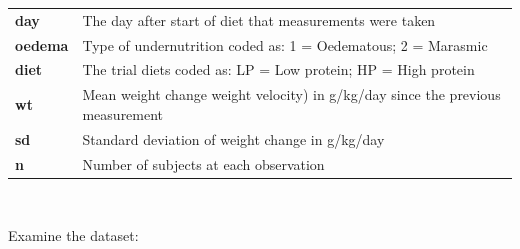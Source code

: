 \documentclass[12pt,a4paper]{book}
\theoremstyle{definition}
\theoremstyle{definition}
\theoremstyle{definition}
\theoremstyle{remark}
\begin{document}
\begin{longtable}[]{@{}ll@{}}
\toprule
\begin{minipage}[t]{0.16\columnwidth}\raggedright
\textbf{day}\strut
\end{minipage} & \begin{minipage}[t]{0.79\columnwidth}\raggedright
The day after start of diet that measurements were taken\strut
\end{minipage}\tabularnewline
\begin{minipage}[t]{0.16\columnwidth}\raggedright
\textbf{oedema}\strut
\end{minipage} & \begin{minipage}[t]{0.79\columnwidth}\raggedright
Type of undernutrition coded as: 1 = Oedematous; 2 = Marasmic\strut
\end{minipage}\tabularnewline
\begin{minipage}[t]{0.16\columnwidth}\raggedright
\textbf{diet}\strut
\end{minipage} & \begin{minipage}[t]{0.79\columnwidth}\raggedright
The trial diets coded as: LP = Low protein; HP = High protein\strut
\end{minipage}\tabularnewline
\begin{minipage}[t]{0.16\columnwidth}\raggedright
\textbf{wt}\strut
\end{minipage} & \begin{minipage}[t]{0.79\columnwidth}\raggedright
Mean weight change weight velocity) in g/kg/day since the previous
measurement\strut
\end{minipage}\tabularnewline
\begin{minipage}[t]{0.16\columnwidth}\raggedright
\textbf{sd}\strut
\end{minipage} & \begin{minipage}[t]{0.79\columnwidth}\raggedright
Standard deviation of weight change in g/kg/day\strut
\end{minipage}\tabularnewline
\begin{minipage}[t]{0.16\columnwidth}\raggedright
\textbf{n}\strut
\end{minipage} & \begin{minipage}[t]{0.79\columnwidth}\raggedright
Number of subjects at each observation\strut
\end{minipage}\tabularnewline
\bottomrule
\end{longtable}

~

Examine the dataset:
\end{document}
